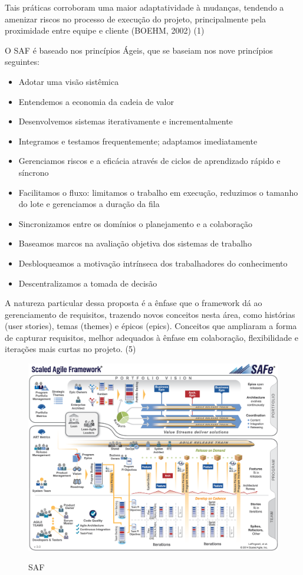 Tais práticas corroboram uma maior adaptatividade à mudanças, tendendo a amenizar riscos no processo de execução do projeto, principalmente pela proximidade entre equipe e cliente (BOEHM, 2002) (1)

O SAF é baseado nos princípios Ágeis, que se baseiam nos nove princípios seguintes:


\begin{itemize}
\item Adotar uma visão sistêmica
\item Entendemos a economia da cadeia de valor
\item Desenvolvemos sistemas iterativamente e incrementalmente
\item Integramos e testamos frequentemente; adaptamos imediatamente
\item Gerenciamos riscos e a eficácia através de ciclos de aprendizado rápido e síncrono
\item Facilitamos o fluxo: limitamos o trabalho em execução, reduzimos o tamanho do lote e gerenciamos a duração da fila
\item Sincronizamos entre os domínios o planejamento e a colaboração
\item Baseamos marcos na avaliação objetiva dos sistemas de trabalho
\item Desbloqueamos a motivação intrínseca dos trabalhadores do conhecimento
\item Descentralizamos a tomada de decisão
\end{itemize}

A natureza particular dessa proposta é a ênfase que o framework dá ao gerenciamento de requisitos, trazendo novos conceitos nesta área, como histórias (user stories), temas (themes) e épicos (epics). Conceitos que ampliaram a forma de capturar requisitos, melhor adequados à ênfase em colaboração, flexibilidade e iterações mais curtas no projeto. (5)

\FloatBarrier
\begin{figure}[!htpd]
		\centering
		\caption{SAF}
		\includegraphics[scale=0.27]{figuras/SAF}
		\label{img:SAF}
\end{figure}
\FloatBarrier


